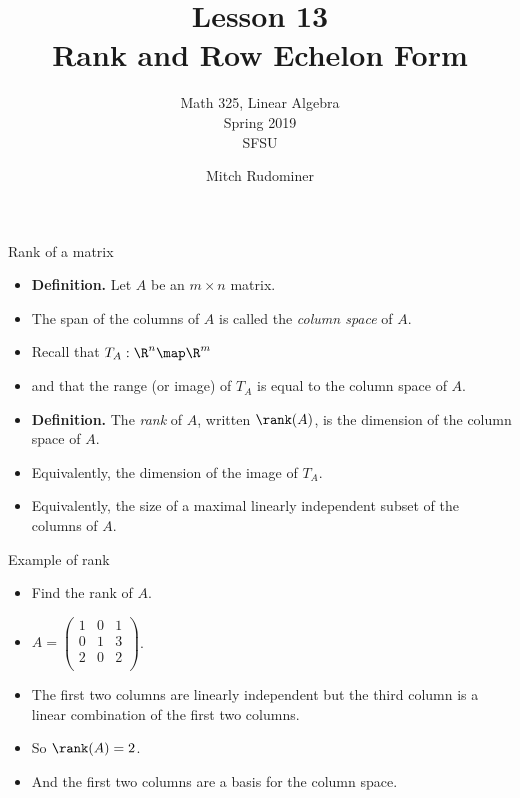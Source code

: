 \documentclass{beamer}
\title{Lesson 13 \\ Rank and Row Echelon Form}
\subtitle{Math 325, Linear Algebra \\ Spring 2019 \\ SFSU}
\author{Mitch Rudominer}
\date{}
\begin{document}
\begin{frame}
  \titlepage
\end{frame}


\begin{frame}{Rank of a matrix}

\begin{itemize}
\item \textbf{Definition.} Let $A$ be an $m\times n$ matrix.
\item The span of the columns of $A$ is called the \emph{column space} of $A$.
\item Recall that $T_A:\R^n\map\R^m$
\item and that the range (or image) of $T_A$ is equal to the column space of $A$.
\item \textbf{Definition.} The \emph{rank} of $A$, written $\rank(A)$,
is the dimension of the column space of $A$.\
\item Equivalently, the dimension of the image of $T_A$.
\item Equivalently, the size of a maximal linearly independent subset of
the columns of $A$.
\end{itemize}
\end{frame}

\begin{frame}{Example of rank}

\begin{itemize}
\item Find the rank of $A$.
\item $A=
\begin{pmatrix}
1  & 0  & 1 \\
0  & 1  & 3 \\
2  & 0  & 2 \\
\end{pmatrix}
$.
\item The first two columns are linearly independent but the third column
is a linear combination of the first two columns.
\item So $\rank(A) = 2$.
\item And the first two columns are a basis for the column space.
\end{itemize}


\end{frame}

\end{document}
